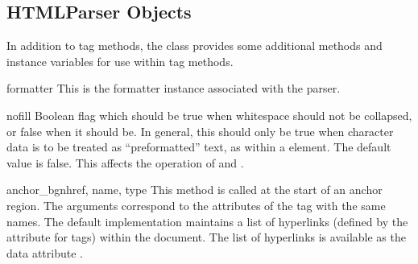 \begin{seealso}
\end{seealso}


\subsection{HTMLParser Objects \label{html-parser-objects}}

In addition to tag methods, the  class provides some
additional methods and instance variables for use within tag methods.

\begin{memberdesc}[HTMLParser]{formatter}
This is the formatter instance associated with the parser.
\end{memberdesc}

\begin{memberdesc}[HTMLParser]{nofill}
Boolean flag which should be true when whitespace should not be
collapsed, or false when it should be.  In general, this should only
be true when character data is to be treated as ``preformatted'' text,
as within a  element.  The default value is false.  This
affects the operation of  and .
\end{memberdesc}


\begin{methoddesc}[HTMLParser]{anchor_bgn}{href, name, type}
This method is called at the start of an anchor region.  The arguments
correspond to the attributes of the  tag with the same
names.  The default implementation maintains a list of hyperlinks
(defined by the  attribute for  tags) within the
document.  The list of hyperlinks is available as the data attribute
.
\end{methoddesc}

